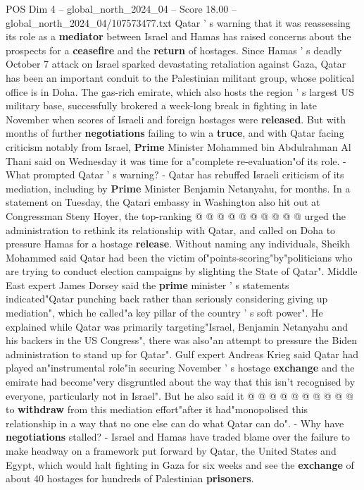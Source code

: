 \begin{textsample}{POS Dim 4 – global\_north\_2024\_04 – Score 18.00 – global\_north\_2024\_04/107573477.txt}  \label{ex:f4_pos_369}
Qatar ' s warning that it was reassessing its role as a \textbf{mediator} between Israel and Hamas has raised concerns about the prospects for a \textbf{ceasefire} and the \textbf{return} of hostages.
Since Hamas ' s deadly October 7 attack on Israel sparked devastating retaliation against Gaza, Qatar has been an important conduit to the Palestinian militant group, whose political office is in Doha.
The gas-rich emirate, which also hosts the region ' s largest US military base, successfully brokered a week-long break in fighting in late November when scores of Israeli and foreign hostages were \textbf{released}.
But with months of further \textbf{negotiations} failing to win a \textbf{truce}, and with Qatar facing criticism notably from Israel, \textbf{Prime} Minister Mohammed bin Abdulrahman Al Thani said on Wednesday it was time for a"complete re-evaluation"of its role. - What prompted Qatar ' s warning? - Qatar has rebuffed Israeli criticism of its mediation, including by \textbf{Prime} Minister Benjamin Netanyahu, for months.
In a statement on Tuesday, the Qatari embassy in Washington also hit out at Congressman Steny Hoyer, the top-ranking @ @ @ @ @ @ @ @ @ @ urged the administration to rethink its relationship with Qatar, and called on Doha to pressure Hamas for a hostage \textbf{release}.
Without naming any individuals, Sheikh Mohammed said Qatar had been the victim of"points-scoring"by"politicians who are trying to conduct election campaigns by slighting the State of Qatar".
Middle East expert James Dorsey said the \textbf{prime} minister ' s statements indicated"Qatar punching back rather than seriously considering giving up mediation", which he called"a key pillar of the country ' s soft power".
He explained while Qatar was primarily targeting"Israel, Benjamin Netanyahu and his backers in the US Congress", there was also"an attempt to pressure the Biden administration to stand up for Qatar".
Gulf expert Andreas Krieg said Qatar had played an"instrumental role"in securing November ' s hostage \textbf{exchange} and the emirate had become"very disgruntled about the way that this isn't recognised by everyone, particularly not in Israel".
But he also said it @ @ @ @ @ @ @ @ @ @ to \textbf{withdraw} from this mediation effort"after it had"monopolised this relationship in a way that no one else can do what Qatar can do". - Why have \textbf{negotiations} stalled? - Israel and Hamas have traded blame over the failure to make headway on a framework put forward by Qatar, the United States and Egypt, which would halt fighting in Gaza for six weeks and see the \textbf{exchange} of about 40 hostages for hundreds of Palestinian \textbf{prisoners}.

\end{textsample}
